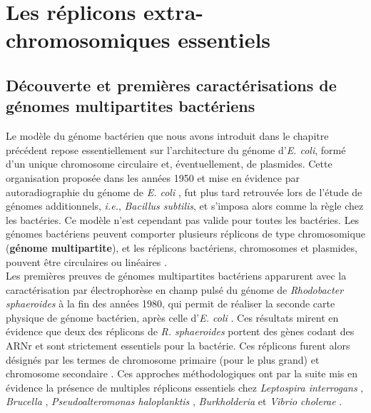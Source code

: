 \newpage
\chapter{Les réplicons extra-chromosomiques essentiels}\label{chap1b}

\section{Découverte et premières caractérisations de génomes multipartites bactériens}
     
      Le modèle du génome bactérien que nous avons introduit dans le chapitre précédent repose essentiellement sur l'architecture du génome d'\textit{E. coli}, formé d'un unique chromosome circulaire et, éventuellement, de plasmides. Cette organisation proposée dans les années 1950 \citep{wollman1956conjugation} et mise en évidence par autoradiographie  du génome de \textit{E. coli} \citep{cairns1963chromosome}, fut plus tard retrouvée lors de l'étude de génomes additionnels, \textit{i.e.}, \textit{Bacillus subtilis}, et s'imposa alors comme la règle chez les bactéries. Ce modèle n'est cependant pas valide pour toutes les bactéries. Les génomes bactériens peuvent comporter plusieurs réplicons de type chromosomique (\textbf{génome multipartite}), et les réplicons bactériens, chromosomes et plasmides, pouvent être circulaires ou linéaires \citep{baril1989linear,kolsto1997dynamic,casjens1998diverse}.\\
       Les premières preuves de génomes multipartites bactériens apparurent avec la caractérisation par électrophorèse en champ pulsé du génome de \textit{Rhodobacter sphaeroides} à la fin des années 1980, qui permit de réaliser la seconde carte physique de génome  bactérien, après celle d'\textit{E. coli} \citep{suwanto1989physical,suwanto1989physicala}. Ces résultats mirent en évidence que deux des réplicons de \textit{R. sphaeroides} portent des gènes codant des ARNr et sont strictement essentiels pour la bactérie. Ces réplicons furent alors désignés par les termes de chromosome primaire (pour le plus grand) et chromosome secondaire \citep{suwanto1989physical}. Ces approches méthodologiques ont par la suite mis en évidence la présence de multiples réplicons essentiels chez \textit{Leptospira interrogans} \citep{zuerner1993comparison}, \textit{Brucella} \citep{michaux1993presence}, \textit{Pseudoalteromonas haloplanktis} \citep{lanoil1996marine}, \textit{Burkholderia} \citep{rodley1995physical} et \textit{Vibrio cholerae} \citep{trucksis1998vibrio}.\\           
